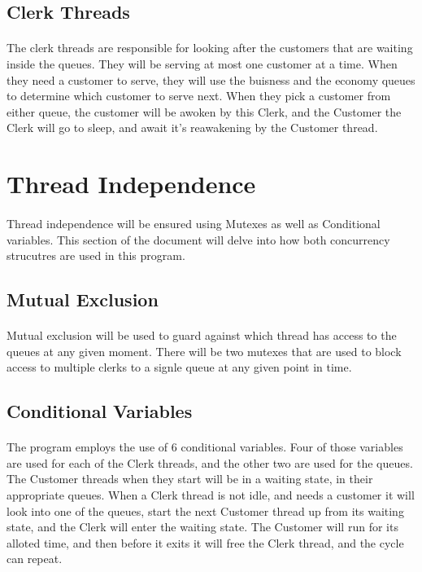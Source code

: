 \documentclass[12pt, letterpaper]{article}
\begin{document}
\subsection{Clerk Threads}
\paragraph{}
The clerk threads are responsible for looking after the customers that are waiting inside the queues. They will be serving at most one customer at a time. When they need a customer to serve, they will use the buisness and the economy queues to determine which customer to serve next. When they pick a customer from either queue, the customer will be awoken by this Clerk, and the Customer the Clerk will go to sleep, and await it's reawakening by the Customer thread.


\section{Thread Independence}
\paragraph{}
Thread independence will be ensured using Mutexes as well as Conditional variables. This section of the document will delve into how both concurrency strucutres are used in this program.

\subsection{Mutual Exclusion}
\paragraph{}
Mutual exclusion will be used to guard against which thread has access to the queues at any given moment. There will be two mutexes that are used to block access to multiple clerks to a signle queue at any given point in time.

\subsection{Conditional Variables}
\paragraph{}
The program employs the use of 6 conditional variables. Four of those variables are used for each of the Clerk threads, and the other two are used for the queues. The Customer threads when they start will be in a waiting state, in their appropriate queues. When a Clerk thread is not idle, and needs a customer it will look into one of the queues, start the next Customer thread up from its waiting state, and the Clerk will enter the waiting state. The Customer will run for its alloted time, and then before it exits it will free the Clerk thread, and the cycle can repeat.
\end{document}
